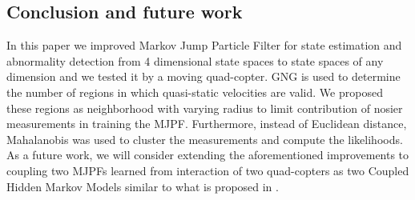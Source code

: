 \documentclass{article}
\begin{document}
\begin{multicols}{2}
    
    \section{Conclusion and future work}\label{sec:conclusion}
        In this paper we improved Markov Jump Particle Filter for state estimation and abnormality detection from 4 dimensional state spaces to state spaces of any dimension and we tested it by a moving quad-copter. GNG is used to determine the number of regions in which quasi-static velocities are valid. We proposed these regions as neighborhood with varying radius to limit contribution of nosier measurements in training the MJPF. Furthermore, instead of Euclidean distance, Mahalanobis was used to cluster the measurements and compute the likelihoods. As a future work, we will consider extending the aforementioned improvements to coupling two MJPFs learned from interaction of two quad-copters as two Coupled Hidden Markov Models \cite{rezek-2000-learning-interaction-dynamics-with-couple-hidden-markov-models} similar to what is proposed in \cite{baydoun-2019-prediction-of-multi-target-dynamics-using-discrete-descriptors-an-interactive-approach}. 
        



\end{multicols}
\end{document}
